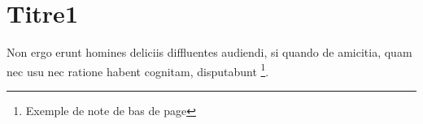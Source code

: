 \section{Titre1}

Non ergo erunt homines deliciis diffluentes audiendi, si quando de amicitia, quam nec usu nec ratione habent cognitam, disputabunt \footnote{Exemple de note de bas de page}.





